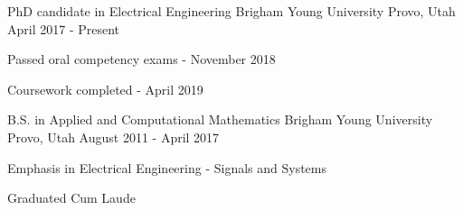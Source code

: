 

\begin{cventries}

  \cventry
    {PhD candidate in Electrical Engineering} %
    {Brigham Young University} %
    {Provo, Utah} %
    {April 2017 - Present} %
    {
      \begin{cvitems}
      \item {Passed oral competency exams - November 2018}
      \item {Coursework completed - April 2019}
      \end{cvitems}
    }

  \cventry
    {B.S. in Applied and Computational Mathematics} %
    {Brigham Young University} %
    {Provo, Utah} %
    {August 2011 - April 2017} %
    {
      \begin{cvitems} %
        \item {Emphasis in Electrical Engineering - Signals and Systems}
        \item {Graduated Cum Laude}
      \end{cvitems}
    }

\end{cventries}
